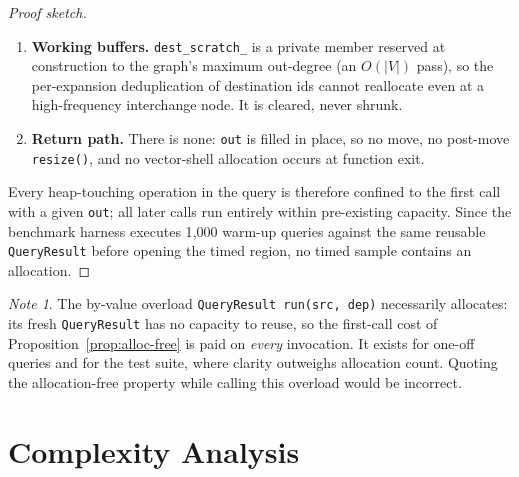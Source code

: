 \documentclass[11pt, a4paper]{article}
\theoremstyle{remark}
\newtheorem*{note}{Note}
\begin{document}
\begin{proof}[Proof sketch]
\begin{enumerate}
        \item \textbf{Working buffers.} \texttt{dest\_scratch\_} is a private
              member reserved at construction to the graph's maximum out-degree
              (an $O(|V|)$ pass), so the per-expansion deduplication of
              destination ids cannot reallocate even at a high-frequency
              interchange node. It is cleared, never shrunk.

        \item \textbf{Return path.} There is none: \texttt{out} is filled in place,
              so no move, no post-move \texttt{resize()}, and no vector-shell
              allocation occurs at function exit.
    \end{enumerate}

    Every heap-touching operation in the query is therefore confined to the first
    call with a given \texttt{out}; all later calls run entirely within
    pre-existing capacity. Since the benchmark harness executes 1{,}000 warm-up
    queries against the same reusable \texttt{QueryResult} before opening the
    timed region, no timed sample contains an allocation.
\end{proof}

\begin{note}
The by-value overload \texttt{QueryResult run(src, dep)} necessarily allocates:
its fresh \texttt{QueryResult} has no capacity to reuse, so the first-call cost of
Proposition~\ref{prop:alloc-free} is paid on \emph{every} invocation. It exists for
one-off queries and for the test suite, where clarity outweighs allocation count.
Quoting the allocation-free property while calling this overload would be incorrect.
\end{note}

\section{Complexity Analysis}
\end{document}

